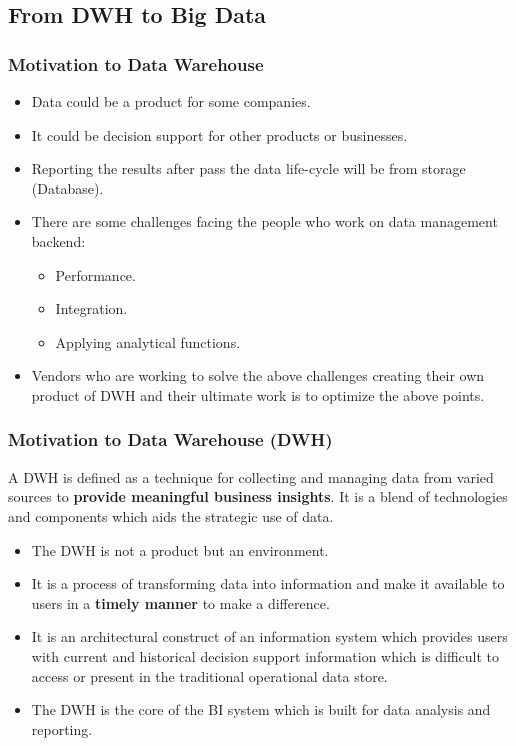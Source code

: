 

\subsection{From DWH to Big Data}
\begin{frame}
\frametitle{Motivation to Data Warehouse}
\begin{itemize}[<+->]
\item Data could be a product for some companies.
\item It could be decision support for other products or businesses.
\item Reporting the results after pass the data life-cycle will be from storage (Database).
\item There are some challenges facing the people who work on data management backend:
\begin{itemize}[<+->]
\item Performance.
\item Integration.
\item Applying analytical functions. %
\end{itemize}
\item Vendors who are working to solve the above challenges creating their own product of DWH and their ultimate work is to optimize the above points.
\end{itemize}
\end{frame}

\begin{frame}
\frametitle{Motivation to Data Warehouse (DWH)}

\begin{definition} A DWH is defined as a technique for collecting and managing data from varied sources to \textbf{provide meaningful business insights}. It is a blend of technologies and components which aids the strategic use of data.%
\end{definition}

\begin{itemize}[<+->]
\item The DWH is not a product but an environment.
\item It is a process of transforming data into information and make it available to users in a \textbf{timely manner} to make a difference.
\item It is an architectural construct of an information system which provides users with current and historical decision support information which is difficult to access or present in the traditional operational data store.
\item The DWH is the core of the BI system which is built for data analysis and reporting.
\end{itemize}



\end{frame}

